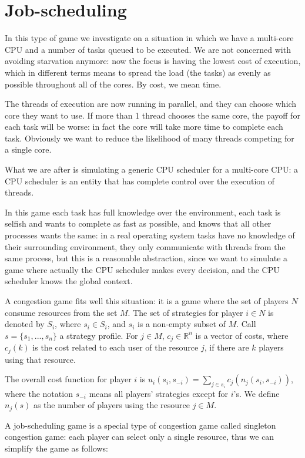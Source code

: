 \section{Job-scheduling}

In this type of game we investigate on a situation in which we have a
multi-core CPU and a number of tasks queued to be executed. We are not
concerned with avoiding starvation anymore: now the focus is having the
lowest cost of execution, which in different terms means to spread the
load (the tasks) as evenly as possible throughout all of the cores. By
cost, we mean time.

The threads of execution are now running in parallel, and they can
choose which core they want to use. If more than 1 thread chooses the
same core, the payoff for each task will be worse: in fact the core will
take more time to complete each task. Obviously we want to reduce the
likelihood of many threads competing for a single core.

What we are after is simulating a generic CPU scheduler for a multi-core
CPU: a CPU scheduler is an entity that has complete control over the
execution of threads.

In this game each task has full knowledge over the environment, each
task is selfish and wants to complete as fast as possible, and knows
that all other processes wants the same: in a real operating system
tasks have no knowledge of their surrounding environment, they only
communicate with threads from the same process, but this is a reasonable
abstraction, since we want to simulate a game where actually the CPU
scheduler makes every decision, and the CPU scheduler knows the global
context.

A congestion game fits well this
situation: it is a game where the set of players \(N\) consume resources
from the set \(M\). The set of strategies for player \(i\in N\) is
denoted by \(S_i\), where \(s_i \in S_i\), and \(s_i\) is a non-empty
subset of \(M\). Call \(s = \{s_1,...,s_n\}\) a strategy profile. For
\(j\in M\), \(c_j\in \mathbb{R}^n\) is a vector of costs, where
\(c_j(k)\) is the cost related to each user of the resource \(j\), if
there are \(k\) players using that resource.

The overall cost function for player \(i\) is
\(u_i(s_i, s_{-i})=\sum_{j\in s_i} c_j(n_j(s_i, s_{-i}))\), where the
notation \(s_{-i}\) means all players' strategies except for \(i\)'s. We
define \(n_j(s)\) as the number of players using the resource
\(j\in M\).

A job-scheduling game is a special type of congestion game called
singleton congestion game: each player can select only a single
resource, thus we can simplify the game as follows:

